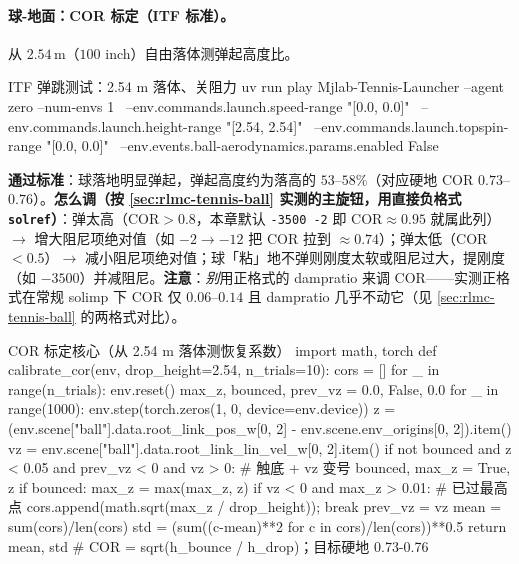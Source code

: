 \paragraph{球-地面：COR 标定（ITF 标准）。}从 $2.54$\,m（$100$ inch）自由落体测弹起高度比。

\begin{codebox}[bash]{ITF 弹跳测试：2.54 m 落体、关阻力}
uv run play Mjlab-Tennis-Launcher --agent zero --num-envs 1 \
  --env.commands.launch.speed-range "[0.0, 0.0]" \
  --env.commands.launch.height-range "[2.54, 2.54]" \
  --env.commands.launch.topspin-range "[0.0, 0.0]" \
  --env.events.ball-aerodynamics.params.enabled False
\end{codebox}

\textbf{通过标准}：球落地明显弹起，弹起高度约为落高的 $53$--$58\%$（对应硬地 COR $0.73$--$0.76$）。\textbf{怎么调（按 \cref{sec:rlmc-tennis-ball} 实测的主旋钮，用直接负格式 \texttt{solref}）}：弹太高（COR$>0.8$，本章默认 \texttt{-3500 -2} 即 COR$\approx0.95$ 就属此列）$\to$ 增大阻尼项绝对值（如 $-2\to-12$ 把 COR 拉到 $\approx0.74$）；弹太低（COR$<0.5$）$\to$ 减小阻尼项绝对值；球「粘」地不弹则刚度太软或阻尼过大，提刚度（如 $-3500$）并减阻尼。\textbf{注意}：\emph{别}用正格式的 dampratio 来调 COR——实测正格式在常规 solimp 下 COR 仅 $0.06$--$0.14$ 且 dampratio 几乎不动它（见 \cref{sec:rlmc-tennis-ball} 的两格式对比）。

\begin{codebox}[Python]{COR 标定核心（从 2.54 m 落体测恢复系数）}
import math, torch
def calibrate_cor(env, drop_height=2.54, n_trials=10):
    cors = []
    for _ in range(n_trials):
        env.reset()
        max_z, bounced, prev_vz = 0.0, False, 0.0
        for _ in range(1000):
            env.step(torch.zeros(1, 0, device=env.device))
            z  = (env.scene["ball"].data.root_link_pos_w[0, 2]
                  - env.scene.env_origins[0, 2]).item()
            vz = env.scene["ball"].data.root_link_lin_vel_w[0, 2].item()
            if not bounced and z < 0.05 and prev_vz < 0 and vz > 0:  # 触底 + vz 变号
                bounced, max_z = True, z
            if bounced:
                max_z = max(max_z, z)
                if vz < 0 and max_z > 0.01:                          # 已过最高点
                    cors.append(math.sqrt(max_z / drop_height)); break
            prev_vz = vz
    mean = sum(cors)/len(cors)
    std  = (sum((c-mean)**2 for c in cors)/len(cors))**0.5
    return mean, std
# COR = sqrt(h_bounce / h_drop)；目标硬地 0.73-0.76
\end{codebox}

